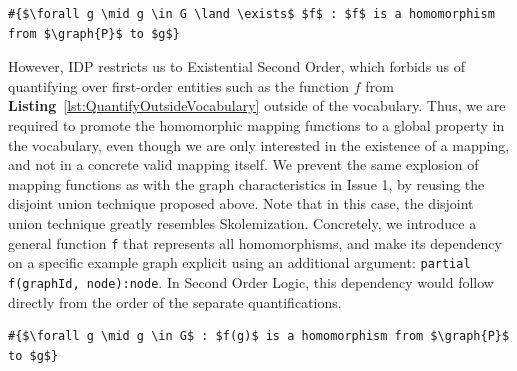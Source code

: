 \begin{center}
\begin{minipage}{0.64\linewidth}
\begin{lstlisting}[mathescape, caption=Quantifying over functions outside the vocabulary, label=lst:QuantifyOutsideVocabulary]
#{$\forall g \mid g \in G \land \exists$ $f$ : $f$ is a homomorphism from $\graph{P}$ to $g$}
\end{lstlisting}
\end{minipage}
\end{center}
However, IDP restricts us to Existential Second Order, which forbids us of quantifying over first-order entities such as the function $f$ from \textbf{Listing}~\ref{lst:QuantifyOutsideVocabulary} outside of the vocabulary.
Thus, we are required to promote the homomorphic mapping functions to a global property in the vocabulary, even though we are only interested in the existence of a mapping, and not in  a concrete valid mapping itself.
We prevent the same explosion of mapping functions as with the graph characteristics in Issue 1, by reusing the disjoint union technique proposed above. 
Note that in this case, the disjoint union technique greatly resembles Skolemization.
Concretely, we introduce a general function \verb|f| that represents all homomorphisms, and make its dependency on a specific example graph explicit using an additional argument:
\verb|partial f(graphId, node):node|.
In Second Order Logic, this dependency would follow directly from the order of the separate quantifications.

\begin{center}
\begin{minipage}{0.54\linewidth}
\begin{lstlisting}[mathescape, caption=Globalized existential functions, label=lst:GlobalizeExistentialQuantifications]
#{$\forall g \mid g \in G$ : $f(g)$ is a homomorphism from $\graph{P}$ to $g$}
\end{lstlisting}
\end{minipage}
\end{center}

